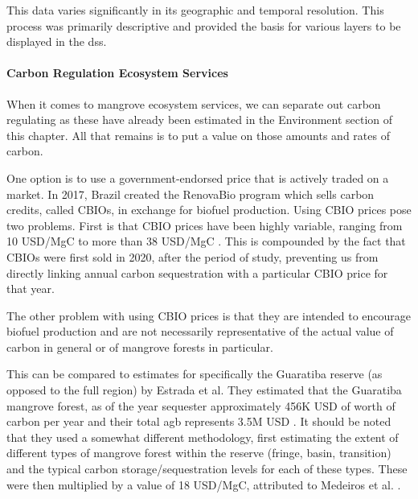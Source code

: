 This data varies significantly in its geographic and temporal resolution. This process was primarily descriptive and provided the basis for various layers to be displayed in the \ac{dss}.

\paragraph{Carbon Regulation Ecosystem Services} \leavevmode\newline

When it comes to mangrove ecosystem services, we can separate out carbon regulating as these have already been estimated in the Environment section of this chapter. All that remains is to put a value on those amounts and rates of carbon.

One option is to use a government-endorsed price that is actively traded on a market. In 2017, Brazil created the RenovaBio program which sells carbon credits, called CBIOs, in exchange for biofuel production. Using CBIO prices pose two problems. First is that CBIO prices have been highly variable, ranging from 10 USD/MgC \cite{castroBrazilianCarbonCredit2020} to more than 38 USD/MgC \cite{barrosBiofuelsAnnual2022}. This is compounded by the fact that CBIOs were first sold in 2020, after the period of study, preventing us from directly linking annual carbon sequestration with a particular CBIO price for that year.

The other problem with using CBIO prices is that they are intended to encourage biofuel production and are not necessarily representative of the actual value of carbon in general or of mangrove forests in particular.   

This can be compared to estimates for specifically the Guaratiba reserve (as opposed to the full region) by Estrada et al. They estimated that the Guaratiba mangrove forest, as of the year  sequester approximately 456K USD of worth of carbon per year and their total \ac{agb} represents 3.5M USD \cite{estradaEconomicEvaluationCarbon2015}. It should be noted that they used a somewhat different methodology, first estimating the extent of different types of mangrove forest within the reserve (fringe, basin, transition) and the typical carbon storage/sequestration levels for each of these types. These were then multiplied by a value of 18 USD/MgC, attributed to Medeiros et al. \cite{medeirosContribuicaoUnidadesConservacao2011}. 

